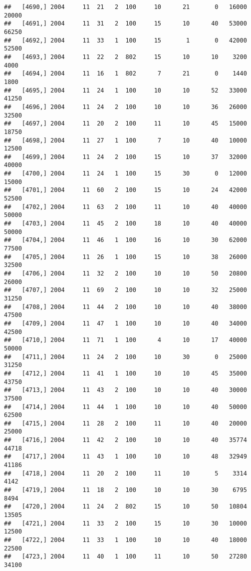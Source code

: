 \documentclass{article}\usepackage[]{graphicx}\usepackage[]{color}
\makeatletter
\newenvironment{kframe}{%
 \def\at@end@of@kframe{}%
 \ifinner\ifhmode%
  \def\at@end@of@kframe{\end{minipage}}%
  \begin{minipage}{\columnwidth}%
 \fi\fi%
 \def\FrameCommand##1{\hskip\@totalleftmargin \hskip-\fboxsep
 \colorbox{shadecolor}{##1}\hskip-\fboxsep
     \hskip-\linewidth \hskip-\@totalleftmargin \hskip\columnwidth}%
 \MakeFramed {\advance\hsize-\width
   \@totalleftmargin\z@ \linewidth\hsize
   \@setminipage}}%
 {\par\unskip\endMakeFramed%
 \at@end@of@kframe}
\newenvironment{knitrout}{}{} %
\makeatother
\begin{document}
\begin{knitrout}
\begin{kframe}
\begin{verbatim}
##   [4690,] 2004     11  21   2  100     10      21       0   16000   20000
##   [4691,] 2004     11  31   2  100     15      10      40   53000   66250
##   [4692,] 2004     11  33   1  100     15       1       0   42000   52500
##   [4693,] 2004     11  22   2  802     15      10      10    3200    4000
##   [4694,] 2004     11  16   1  802      7      21       0    1440    1800
##   [4695,] 2004     11  24   1  100     10      10      52   33000   41250
##   [4696,] 2004     11  24   2  100     10      10      36   26000   32500
##   [4697,] 2004     11  20   2  100     11      10      45   15000   18750
##   [4698,] 2004     11  27   1  100      7      10      40   10000   12500
##   [4699,] 2004     11  24   2  100     15      10      37   32000   40000
##   [4700,] 2004     11  24   1  100     15      30       0   12000   15000
##   [4701,] 2004     11  60   2  100     15      10      24   42000   52500
##   [4702,] 2004     11  63   2  100     11      10      40   40000   50000
##   [4703,] 2004     11  45   2  100     18      10      40   40000   50000
##   [4704,] 2004     11  46   1  100     16      10      30   62000   77500
##   [4705,] 2004     11  26   1  100     15      10      38   26000   32500
##   [4706,] 2004     11  32   2  100     10      10      50   20800   26000
##   [4707,] 2004     11  69   2  100     10      10      32   25000   31250
##   [4708,] 2004     11  44   2  100     10      10      40   38000   47500
##   [4709,] 2004     11  47   1  100     10      10      40   34000   42500
##   [4710,] 2004     11  71   1  100      4      10      17   40000   50000
##   [4711,] 2004     11  24   2  100     10      30       0   25000   31250
##   [4712,] 2004     11  41   1  100     10      10      45   35000   43750
##   [4713,] 2004     11  43   2  100     10      10      40   30000   37500
##   [4714,] 2004     11  44   1  100     10      10      40   50000   62500
##   [4715,] 2004     11  28   2  100     11      10      40   20000   25000
##   [4716,] 2004     11  42   2  100     10      10      40   35774   44718
##   [4717,] 2004     11  43   1  100     10      10      48   32949   41186
##   [4718,] 2004     11  20   2  100     11      10       5    3314    4142
##   [4719,] 2004     11  18   2  100     10      10      30    6795    8494
##   [4720,] 2004     11  24   2  802     15      10      50   10804   13505
##   [4721,] 2004     11  33   2  100     15      10      30   10000   12500
##   [4722,] 2004     11  33   1  100     10      10      40   18000   22500
##   [4723,] 2004     11  40   1  100     11      10      50   27280   34100

\end{verbatim}
\end{kframe}
\end{knitrout}
\end{document}
